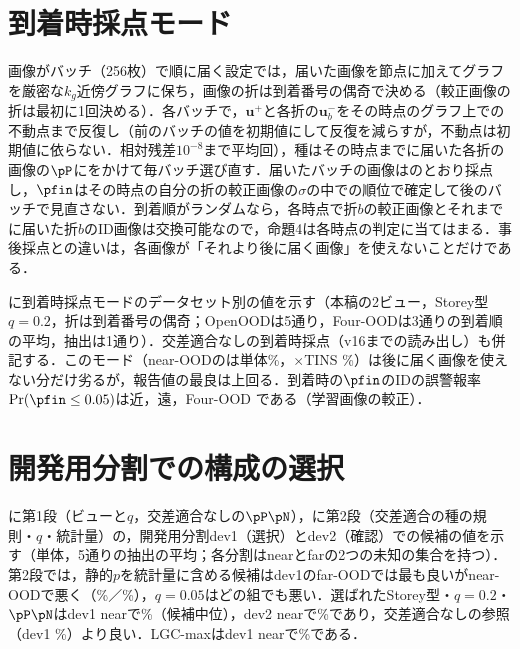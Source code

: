 \section{到着時採点モード}
\label{sec:app_online}
画像がバッチ（256枚）で順に届く設定では，届いた画像を節点に加えてグラフを厳密な$k_g$近傍グラフに保ち，画像の折は到着番号の偶奇で決める（較正画像の折は最初に1回決める）．各バッチで，$\mathbf{u}^{+}$と各折の$\mathbf{u}^{-}_b$をその時点のグラフ上での不動点まで反復し（前のバッチの値を初期値にして反復を減らすが，不動点は初期値に依らない．相対残差$10^{-8}$まで平均\NOnlItersMean{}回），種はその時点までに届いた各折の画像の$\pP$にをかけて毎バッチ選び直す．届いたバッチの画像はのとおり採点し，$\pfin$はその時点の自分の折の較正画像の$\sigma$の中での順位で確定して後のバッチで見直さない．到着順がランダムなら，各時点で折$b$の較正画像とそれまでに届いた折$b$のID画像は交換可能なので，命題4は各時点の判定に当てはまる．事後採点との違いは，各画像が「それより後に届く画像」を使えないことだけである．

に到着時採点モードのデータセット別の値を示す（本稿の2ビュー，Storey型$q{=}0.2$，折は到着番号の偶奇；OpenOODは5通り，Four-OODは3通りの到着順の平均，抽出は1通り）．交差適合なしの到着時採点（v16までの読み出し）も併記する．このモード（near-OODの\FPR{}は単体\NOnlOneFourNoneNearFpr\%，$\times$TINS \NOnlOneFourTinsNearFpr\%）は後に届く画像を使えない分だけ劣るが，報告値の最良は上回る．到着時の$\pfin$のIDの誤警報率$\Pr(\pfin\le0.05)$は近\NOnlOneFourValNearFprZeroZeroFive{}，遠\NOnlOneFourValFarFprZeroZeroFive{}，Four-OOD \NOnlOneFourValFourFprZeroZeroFive{}である（学習画像の較正）．

\begin{table}[t]
\centering
\caption{到着時採点モードのデータセット別の値（[\%]，AUROC／FPR95）．}
\label{tab:online}
\vspace{1.5mm}

\end{table}

\section{開発用分割での構成の選択}
\label{sec:app_sel}
に第1段（ビューと$q$，交差適合なしの$\pP\pN$），に第2段（交差適合の種の規則・$q$・統計量）の，開発用分割dev1（選択）とdev2（確認）での候補の値を示す（単体，5通りの抽出の平均；各分割はnearとfarの2つの未知の集合を持つ）．第2段では，静的$p$を統計量に含める候補はdev1のfar-OODでは最も良いがnear-OODで悪く（\NSelqDevOnePpsNearFpr\%／\NSelqDevOnePpsFarFpr\%），$q{=}0.05$はどの組でも悪い．選ばれたStorey型・$q{=}0.2$・$\pP\pN$はdev1 nearで\NSelqDevOneNearFpr\%（\NSelqNCandidates{}候補中\NSelqDevOneRankOfChosen{}位），dev2 nearで\NSelqDevTwoNearFpr\%であり，交差適合なしの参照（dev1 \NSelqRefDevOneNearFpr\%）より良い．LGC-maxはdev1 nearで\NSelqDevOneLgcNearFpr\%である．


